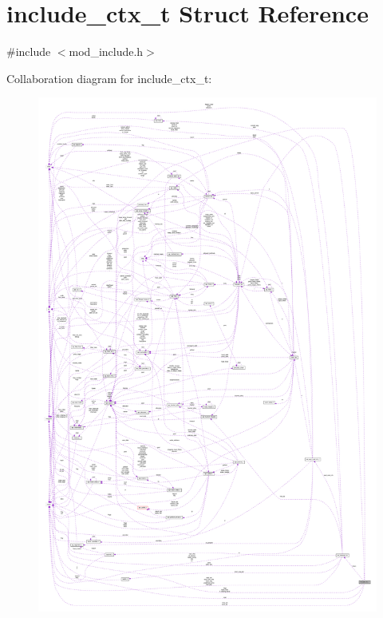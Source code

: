 \hypertarget{structinclude__ctx__t}{}\section{include\+\_\+ctx\+\_\+t Struct Reference}
\label{structinclude__ctx__t}


{\ttfamily \#include $<$mod\+\_\+include.\+h$>$}



Collaboration diagram for include\+\_\+ctx\+\_\+t\+:
\nopagebreak
\begin{figure}[H]
\begin{center}
\leavevmode
\includegraphics[width=350pt]{structinclude__ctx__t__coll__graph}
\end{center}
\end{figure}
